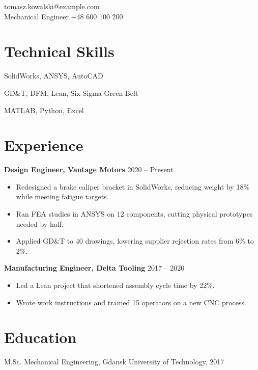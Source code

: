\documentclass[11pt]{article}
\begin{document}
\hfill tomasz.kowalski@example.com\\
Mechanical Engineer \hfill +48 600 100 200
\section*{Technical Skills}
\begin{description}[leftmargin=1.6in,style=nextline,itemsep=0pt]
\item[CAD and Simulation] SolidWorks, ANSYS, AutoCAD
\item[Manufacturing] GD\&T, DFM, Lean, Six Sigma Green Belt
\item[Software] MATLAB, Python, Excel
\end{description}
\section*{Experience}
\textbf{Design Engineer, Vantage Motors} \hfill 2020 -- Present
\begin{itemize}
\item Redesigned a brake caliper bracket in SolidWorks, reducing weight by 18\% while meeting fatigue targets.
\item Ran FEA studies in ANSYS on 12 components, cutting physical prototypes needed by half.
\item Applied GD\&T to 40 drawings, lowering supplier rejection rates from 6\% to 2\%.
\end{itemize}
\textbf{Manufacturing Engineer, Delta Tooling} \hfill 2017 -- 2020
\begin{itemize}
\item Led a Lean project that shortened assembly cycle time by 22\%.
\item Wrote work instructions and trained 15 operators on a new CNC process.
\end{itemize}
\section*{Education}
M.Sc. Mechanical Engineering, Gdansk University of Technology, 2017
\end{document}
